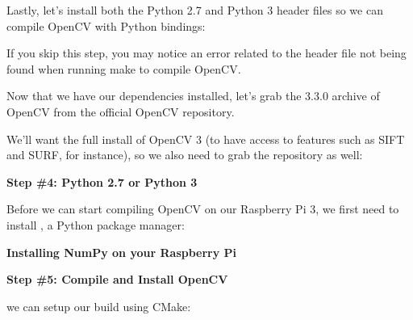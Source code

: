 \medskip

Lastly, let's install both the Python 2.7 and Python 3 header files so we can compile OpenCV with Python bindings:

\medskip


\medskip

If you skip this step, you may notice an error related to the  header file not being found when running make to compile OpenCV.

Now that we have our dependencies installed, let's grab the 3.3.0 archive of OpenCV from the official OpenCV repository.


\medskip




\medskip

We'll want the full install of OpenCV 3 (to have access to features such as SIFT and SURF, for instance), so we also need to grab the  repository as well:


\medskip




\medskip

\textbf{Step \#4: Python 2.7 or Python 3}

Before we can start compiling OpenCV on our Raspberry Pi 3, we first need to install , a Python package manager:

\medskip



\medskip

\textbf{Installing NumPy on your Raspberry Pi}

\medskip


\medskip

\textbf{Step \#5: Compile and Install OpenCV}


we can setup our build using CMake:


